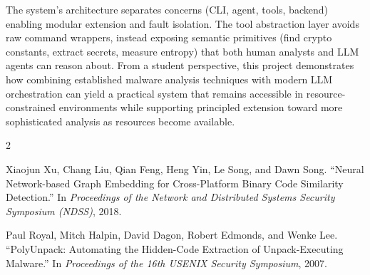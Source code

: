 \documentclass[11pt]{article}
\begin{document}
The system's architecture separates concerns (CLI, agent, tools, backend) enabling modular extension and fault isolation. The tool abstraction layer avoids raw command wrappers, instead exposing semantic primitives (find crypto constants, extract secrets, measure entropy) that both human analysts and LLM agents can reason about. From a student perspective, this project demonstrates how combining established malware analysis techniques with modern LLM orchestration can yield a practical system that remains accessible in resource-constrained environments while supporting principled extension toward more sophisticated analysis as resources become available.

\begin{thebibliography}{2}

Xiaojun Xu, Chang Liu, Qian Feng, Heng Yin, Le Song, and Dawn Song.
``Neural Network-based Graph Embedding for Cross-Platform Binary Code Similarity Detection.''
In \textit{Proceedings of the Network and Distributed Systems Security Symposium (NDSS)}, 2018.

Paul Royal, Mitch Halpin, David Dagon, Robert Edmonds, and Wenke Lee.
``PolyUnpack: Automating the Hidden-Code Extraction of Unpack-Executing Malware.''
In \textit{Proceedings of the 16th USENIX Security Symposium}, 2007.

\end{thebibliography}
\end{document}
